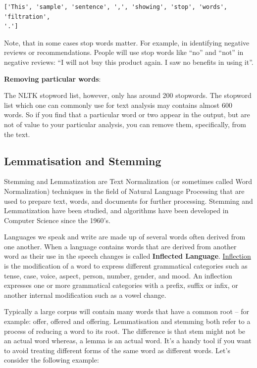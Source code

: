 \documentclass[11pt]{article}
\begin{document}
    \begin{Verbatim}[commandchars=\\\{\}]
['This', 'sample', 'sentence', ',', 'showing', 'stop', 'words', 'filtration',
'.']
    \end{Verbatim}

    Note, that in some cases stop words matter. For example, in identifying
negative reviews or recommendations. People will use stop words like
``no'' and ``not'' in negative reviews: ``I will not buy this product
again. I saw no benefits in using it''.

    \textbf{Removing particular words}:

The NLTK stopword list, however, only has around 200 stopwords. The
stopword list which one can commonly use for text analysis may contains
almost 600 words. So if you find that a particular word or two appear in
the output, but are not of value to your particular analysis, you can
remove them, specifically, from the text.

    \hypertarget{lemmatisation-and-stemming}{%
\subsection{Lemmatisation and
Stemming}\label{lemmatisation-and-stemming}}

    Stemming and Lemmatization are Text Normalization (or sometimes called
Word Normalization) techniques in the field of Natural Language
Processing that are used to prepare text, words, and documents for
further processing. Stemming and Lemmatization have been studied, and
algorithms have been developed in Computer Science since the 1960's.

Languages we speak and write are made up of several words often derived
from one another. When a language contains words that are derived from
another word as their use in the speech changes is called
\textbf{Inflected Language}.
\href{https://en.wikipedia.org/wiki/Inflection}{Inflection} is the
modification of a word to express different grammatical categories such
as tense, case, voice, aspect, person, number, gender, and mood. An
inflection expresses one or more grammatical categories with a prefix,
suffix or infix, or another internal modification such as a vowel
change.

Typically a large corpus will contain many words that have a common root
-- for example: offer, offered and offering. Lemmatisation and stemming
both refer to a process of reducing a word to its root. The difference
is that stem might not be an actual word whereas, a lemma is an actual
word. It's a handy tool if you want to avoid treating different forms of
the same word as different words. Let's consider the following example:
\end{document}
